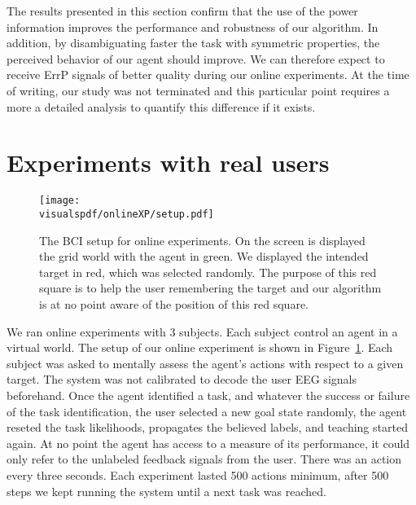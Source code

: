The results presented in this section confirm that the use of the power information improves the performance and robustness of our algorithm. In addition, by disambiguating faster the task with symmetric properties, the perceived behavior of our agent should improve. We can therefore expect to receive ErrP signals of better quality during our online experiments. At the time of writing, our study was not terminated and this particular point requires a more a detailed analysis to quantify this difference if it exists. 


\section{Experiments with real users}

\begin{figure}[!htbp]
\centering
\texttt{[image: \\visualspdf/onlineXP/setup.pdf]}
\caption{The BCI setup for online experiments. On the screen is displayed the grid world with the agent in green. We displayed the intended target in red, which was selected randomly. The purpose of this red square is to help the user remembering the target and our algorithm is at no point aware of the position of this red square.}
\label{fig:BCIsetup}
\end{figure}

We ran online experiments with 3 subjects. Each subject control an agent in a virtual world. The setup of our online experiment is shown in Figure~\ref{fig:BCIsetup}. Each subject was asked to mentally assess the agent's actions with respect to a given target. The system was not calibrated to decode the user EEG signals beforehand. Once the agent identified a task, and whatever the success or failure of the task identification, the user selected a new goal state randomly, the agent reseted the task likelihoods, propagates the believed labels, and teaching started again. At no point the agent has access to a measure of its performance, it could only refer to the unlabeled feedback signals from the user. There was an action every three seconds. Each experiment lasted 500 actions minimum, after 500 steps we kept running the system until a next task was reached.

